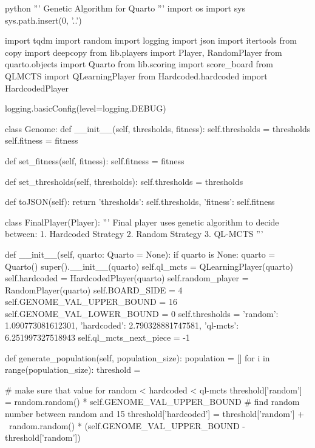 \begin{mintedbox}{python}
'''
Genetic Algorithm for Quarto
'''
import os
import sys
sys.path.insert(0, '..')

import tqdm
import random
import logging
import json
import itertools
from copy import deepcopy
from lib.players import Player, RandomPlayer
from quarto.objects import Quarto
from lib.scoring import score_board
from QLMCTS import QLearningPlayer
from Hardcoded.hardcoded import HardcodedPlayer

logging.basicConfig(level=logging.DEBUG)

class Genome:
    def __init__(self, thresholds, fitness):
        self.thresholds = thresholds
        self.fitness = fitness

    def set_fitness(self, fitness):
        self.fitness = fitness

    def set_thresholds(self, thresholds):
        self.thresholds = thresholds

    def toJSON(self):
        return {
            'thresholds': self.thresholds,
            'fitness': self.fitness
        }


class FinalPlayer(Player):
    '''
    Final player uses genetic algorithm to decide between:
    1. Hardcoded Strategy
    2. Random Strategy
    3. QL-MCTS
    '''

    def __init__(self, quarto: Quarto = None):
        if quarto is None:
            quarto = Quarto()
        super().__init__(quarto)
        self.ql_mcts = QLearningPlayer(quarto)
        self.hardcoded = HardcodedPlayer(quarto)
        self.random_player = RandomPlayer(quarto)
        self.BOARD_SIDE = 4
        self.GENOME_VAL_UPPER_BOUND = 16
        self.GENOME_VAL_LOWER_BOUND = 0
        self.thresholds = {
            'random': 1.090773081612301,
            'hardcoded': 2.790328881747581,
            'ql-mcts': 6.251997327518943
        }
        self.ql_mcts_next_piece = -1

    def generate_population(self, population_size):
        population = []
        for i in range(population_size):
            threshold = {}

            # make sure that value for random < hardcoded < ql-mcts
            threshold['random'] = random.random() * self.GENOME_VAL_UPPER_BOUND
            # find random number between random and 15
            threshold['hardcoded'] = threshold['random'] + \
                random.random() * (self.GENOME_VAL_UPPER_BOUND -
                                    threshold['random'])


\end{mintedbox}
